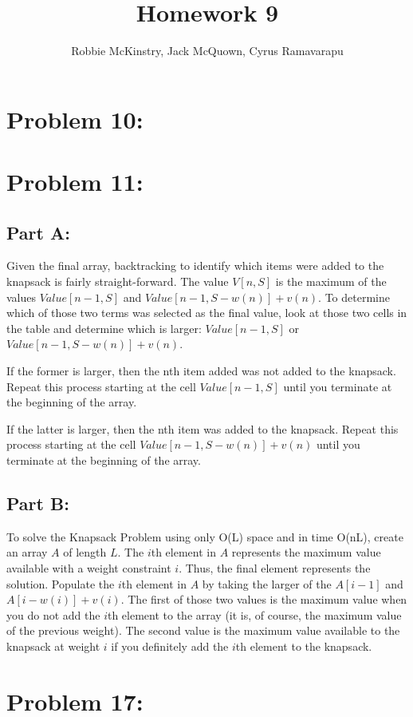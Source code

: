 \documentclass[12pt]{article}
\begin{document}
\title{Homework 9}
\author{Robbie McKinstry, Jack McQuown, Cyrus Ramavarapu}
\renewcommand{\today}{22 September 2016}
\renewcommand{\baselinestretch}{1.5}
\maketitle

\section*{Problem 10: }
\section*{Problem 11: }

\subsection{Part A:}

Given the final array, backtracking to identify which items were added to the knapsack is fairly straight-forward. The value $V[n, S]$ is the maximum of the values $Value[n-1, S]$ and $Value[n-1, S-w(n)] + v(n)$. To determine which of those two terms was selected as the final value, look at those two cells in the table and determine which is larger: $Value[n-1, S]$ or $Value[n-1, S-w(n)] + v(n)$. 

If the former is larger, then the nth item added was not added to the knapsack. Repeat this process starting at the cell $Value[n-1, S]$ until you terminate at the beginning of the array. 

If the latter is larger, then the nth item was added to the knapsack. Repeat this process starting at the cell $Value[n-1, S-w(n)] + v(n)$ until you terminate at the beginning of the array.

\subsection{Part B:}

To solve the Knapsack Problem using only O(L) space and in time O(nL), create an array $A$ of length $L$. The $i$th element in $A$ represents the maximum value available with a weight constraint $i$. Thus, the final element represents the solution. Populate the $i$th element in $A$ by taking the larger of the $A[i-1]$ and $A[i-w(i)] + v(i)$. The first of those two values is the maximum value when you do not add the $i$th element to the array (it is, of course, the maximum value of the previous weight). The second value is the maximum value available to the knapsack at weight $i$ if you definitely add the $i$th element to the knapsack.

\section*{Problem 17: }
\end{document}
